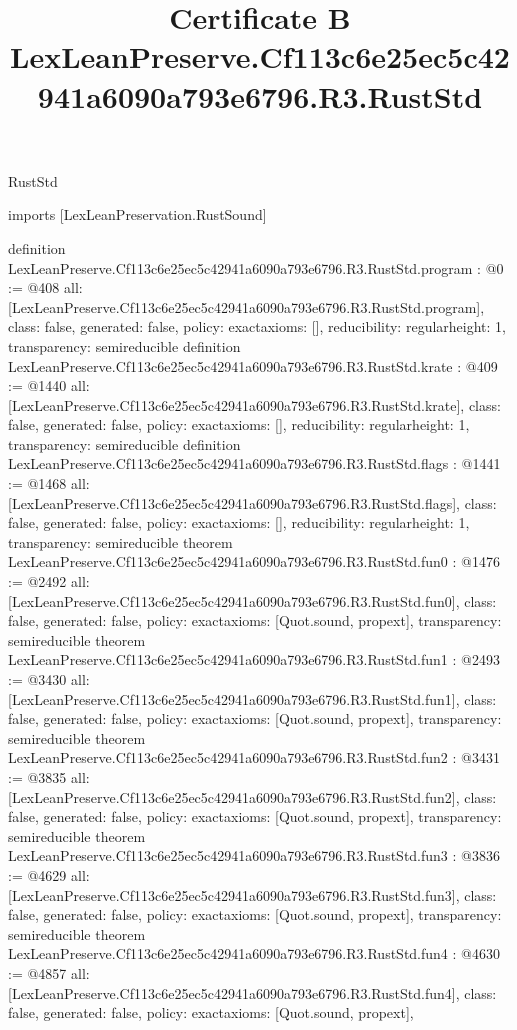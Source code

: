 \begin{lexlean}{RustStd}
\title{Certificate B LexLeanPreserve.Cf113c6e25ec5c42941a6090a793e6796.R3.RustStd}
\begin{coremodule}
imports [LexLeanPreservation.RustSound]

definition LexLeanPreserve.Cf113c6e25ec5c42941a6090a793e6796.R3.RustStd.program : @0 := @408 {
  all: [LexLeanPreserve.Cf113c6e25ec5c42941a6090a793e6796.R3.RustStd.program],
  class: false,
  generated: false,
  policy: exact{axioms: []},
  reducibility: regular{height: 1},
  transparency: semireducible
}
definition LexLeanPreserve.Cf113c6e25ec5c42941a6090a793e6796.R3.RustStd.krate : @409 := @1440 {
  all: [LexLeanPreserve.Cf113c6e25ec5c42941a6090a793e6796.R3.RustStd.krate],
  class: false,
  generated: false,
  policy: exact{axioms: []},
  reducibility: regular{height: 1},
  transparency: semireducible
}
definition LexLeanPreserve.Cf113c6e25ec5c42941a6090a793e6796.R3.RustStd.flags : @1441 := @1468 {
  all: [LexLeanPreserve.Cf113c6e25ec5c42941a6090a793e6796.R3.RustStd.flags],
  class: false,
  generated: false,
  policy: exact{axioms: []},
  reducibility: regular{height: 1},
  transparency: semireducible
}
theorem LexLeanPreserve.Cf113c6e25ec5c42941a6090a793e6796.R3.RustStd.fun0 : @1476 := @2492 {
  all: [LexLeanPreserve.Cf113c6e25ec5c42941a6090a793e6796.R3.RustStd.fun0],
  class: false,
  generated: false,
  policy: exact{axioms: [Quot.sound, propext]},
  transparency: semireducible
}
theorem LexLeanPreserve.Cf113c6e25ec5c42941a6090a793e6796.R3.RustStd.fun1 : @2493 := @3430 {
  all: [LexLeanPreserve.Cf113c6e25ec5c42941a6090a793e6796.R3.RustStd.fun1],
  class: false,
  generated: false,
  policy: exact{axioms: [Quot.sound, propext]},
  transparency: semireducible
}
theorem LexLeanPreserve.Cf113c6e25ec5c42941a6090a793e6796.R3.RustStd.fun2 : @3431 := @3835 {
  all: [LexLeanPreserve.Cf113c6e25ec5c42941a6090a793e6796.R3.RustStd.fun2],
  class: false,
  generated: false,
  policy: exact{axioms: [Quot.sound, propext]},
  transparency: semireducible
}
theorem LexLeanPreserve.Cf113c6e25ec5c42941a6090a793e6796.R3.RustStd.fun3 : @3836 := @4629 {
  all: [LexLeanPreserve.Cf113c6e25ec5c42941a6090a793e6796.R3.RustStd.fun3],
  class: false,
  generated: false,
  policy: exact{axioms: [Quot.sound, propext]},
  transparency: semireducible
}
theorem LexLeanPreserve.Cf113c6e25ec5c42941a6090a793e6796.R3.RustStd.fun4 : @4630 := @4857 {
  all: [LexLeanPreserve.Cf113c6e25ec5c42941a6090a793e6796.R3.RustStd.fun4],
  class: false,
  generated: false,
  policy: exact{axioms: [Quot.sound, propext]},
}
\end{coremodule}
\end{lexlean}
